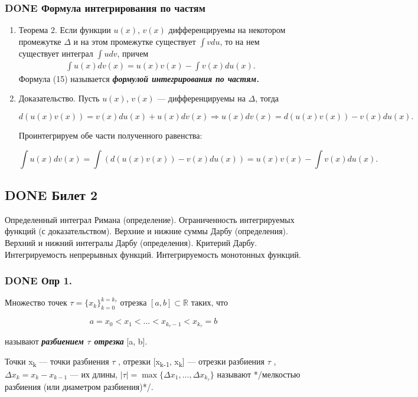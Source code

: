 \documentclass[11pt]{article}
\begin{document}
\subsubsection{{\bfseries\sffamily DONE} Формула интегрирования по частям}
\label{sec:orgf06443a}
\begin{enumerate}
\item Теорема 2.
\label{sec:org231b7b8}
Если функции \(u(x)\), \(v(x)\) дифференцируемы на некотором промежутке
\(\Delta\) и на этом промежутке существует \(\int vdu\), то на нем существует интеграл 
\(\int udv\), причем
\begin{eqnarray}
\int u(x)dv(x)=u(x)v(x)-\int v(x)du(x).
\end{eqnarray}
Формула (15) называется \textbf{\emph{формулой интегрирования по частям.}}
\item Доказательство.
\label{sec:org90d5640}
Пусть \(u(x)\), \(v(x)\) — дифференцируемы на \(\Delta\), тогда

$$
d(u(x)v(x))=v(x)du(x)+u(x)dv(x)\Rightarrow u(x)dv(x)=d(u(x)v(x))-v(x)du(x).
$$

Проинтегрируем обе части полученного равенства:

$$
\int u(x)dv(x)=\int(d(u(x)v(x))-v(x)du(x))=u(x)v(x)-\int v(x)du(x).
$$
\end{enumerate}

\subsection{{\bfseries\sffamily DONE} Билет 2}
\label{sec:orgd9ab310}
Определенный интеграл Римана (определение). Ограниченность интегрируемых функций (с доказательством). Верхние и нижние суммы Дарбу (определения). Верхний и нижний интегралы Дарбу (определения). Критерий Дарбу. Интегрируемость непрерывных функций. Интегрируемость монотонных функций.

\subsubsection{{\bfseries\sffamily DONE} Опр 1.}
\label{sec:org1e8415d}
Множество точек \(\tau=\{x_k\}_{k=0}^{k=k_\tau}\) отрезка \([a,b]\subset \mathbb{R}\) таких, что

$$
a=x_0 < x_1 < ... < x_{k_\tau-1} < x_{k_\tau} = b
$$

называют \textbf{\emph{разбиением \(\tau\) отрезка}} [a, b]. 

Точки x\textsubscript{k} — точки разбиения \(\tau\) , отрезки [x\textsubscript{k-1}, x\textsubscript{k}]
 — отрезки разбиения \(\tau\) , \(\Delta x_k = x_k − x_{k-1}\) — их длины, \(|\tau | = \max \{\Delta x_1 ,... , \Delta x_{k_\tau}\}\) называют */мелкостью разбиения (или диаметром разбиения)*/.
\end{document}
